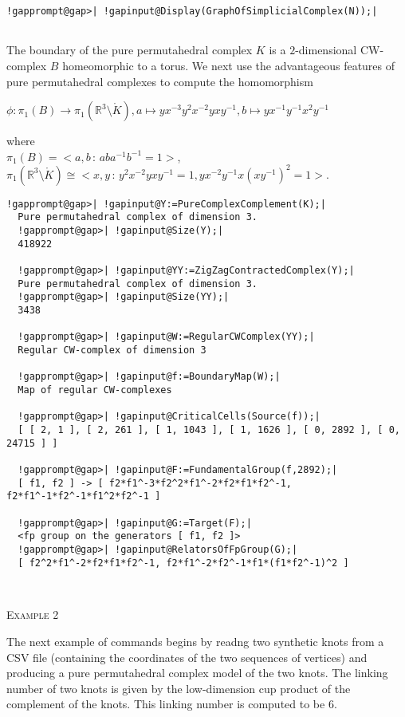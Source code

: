 \documentclass[a4paper,11pt]{report}
\begin{document}
{{\begin{Verbatim}[commandchars=!@|,fontsize=\small,frame=single,label=Example]
  !gapprompt@gap>| !gapinput@Display(GraphOfSimplicialComplex(N));|
  
\end{Verbatim}
  

 The boundary of the pure permutahedral complex $K$ is a $2$-dimensional CW-complex $B$ homeomorphic to a torus. We next use the advantageous features of pure
permutahedral complexes to compute the homomorphism 

$\phi\colon \pi_1(B) \rightarrow \pi_1(\mathbb R^3\setminus \mathring{K}), a
\mapsto yx^{-3}y^2x^{-2}yxy^{-1}, b\mapsto yx^{-1}y^{-1}x^2y^{-1}$ 

where\\
 $\pi_1(B)=< a,b\, :\, aba^{-1}b^{-1}=1>$,\\
 $\pi_1(\mathbb R^3\setminus \mathring{K}) \cong < x,y\, :\,
y^2x^{-2}yxy^{-1}=1, yx^{-2}y^{-1}x(xy^{-1})^2=1>$. 
\begin{Verbatim}[commandchars=!@|,fontsize=\small,frame=single,label=Example]
  !gapprompt@gap>| !gapinput@Y:=PureComplexComplement(K);|
  Pure permutahedral complex of dimension 3.
  !gapprompt@gap>| !gapinput@Size(Y);|
  418922
  
  !gapprompt@gap>| !gapinput@YY:=ZigZagContractedComplex(Y);|
  Pure permutahedral complex of dimension 3.
  !gapprompt@gap>| !gapinput@Size(YY);|
  3438
  
  !gapprompt@gap>| !gapinput@W:=RegularCWComplex(YY);|
  Regular CW-complex of dimension 3
  
  !gapprompt@gap>| !gapinput@f:=BoundaryMap(W);|
  Map of regular CW-complexes
  
  !gapprompt@gap>| !gapinput@CriticalCells(Source(f));|
  [ [ 2, 1 ], [ 2, 261 ], [ 1, 1043 ], [ 1, 1626 ], [ 0, 2892 ], [ 0, 24715 ] ]
  
  !gapprompt@gap>| !gapinput@F:=FundamentalGroup(f,2892);|
  [ f1, f2 ] -> [ f2*f1^-3*f2^2*f1^-2*f2*f1*f2^-1, f2*f1^-1*f2^-1*f1^2*f2^-1 ]
  
  !gapprompt@gap>| !gapinput@G:=Target(F);|
  <fp group on the generators [ f1, f2 ]>
  !gapprompt@gap>| !gapinput@RelatorsOfFpGroup(G);|
  [ f2^2*f1^-2*f2*f1*f2^-1, f2*f1^-2*f2^-1*f1*(f1*f2^-1)^2 ]
  
  
\end{Verbatim}
 

\textsc{Example 2} 

The next example of commands begins by readng two synthetic knots from a CSV
file (containing the coordinates of the two sequences of vertices) and
producing a pure permutahedral complex model of the two knots. The linking
number of two knots is given by the low-dimension cup product of the
complement of the knots. This linking number is computed to be $6$. 

}}
\end{document}
